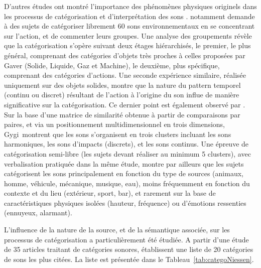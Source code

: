 D'autres études ont montré l'importance des phénomènes physiques originels dans les processus de catégorisation et d'interprétation des sons \citep{marcell2000confrontation,lemaitre2010listener}. \citep{houix_lexical_2012} notamment demande à des sujets de catégoriser librement 60 sons environnementaux en se concentrant sur l'action, et de commenter leurs groupes. Une analyse des groupements révèle que la catégorisation s'opère suivant deux étages hiérarchisés, le premier, le plus général, comprenant des catégories d'objets très proches à celles proposées par Gaver (Solide, Liquide, Gaz et Machine), le deuxième, plus spécifique, comprenant des catégories d'actions. Une seconde expérience similaire, réalisée uniquement sur des objets solides, montre que la nature du pattern temporel (continu ou discret) résultant de l'action à l'origine du son influe de manière significative sur la catégorisation. Ce dernier point est également observé par \citep{gygi2007similarity}. Sur la base d'une matrice de similarité obtenue à partir de comparaisons par paires, et via un positionnement multidimensionnel en trois dimensions, Gygi~\al montrent que les sons s'organisent en trois clusters incluant les sons harmoniques, les sons d'impacts (discrets), et les sons continus. Une épreuve de catégorisation semi-libre (les sujets devant réaliser au minimum 5 clusters), avec verbalisation pratiquée dans la même étude, montre par ailleurs que les sujets catégorisent les sons principalement en fonction du type de sources (animaux, homme, véhicule, mécanique, musique, eau), moins fréquemment en fonction du contexte et du lieu (extérieur, sport, bar), et rarement sur la base de caractéristiques physiques isolées (hauteur, fréquence) ou d'émotions ressenties (ennuyeux, alarmant).

L'influence de la nature de la source, et de la sémantique associée, sur les processus de catégorisation a particulièrement été étudiée. A partir d'une étude de 35 articles traitant de catégories sonores, \citep{niessen2010categories} établissent une liste de 20 catégories de sons les plus citées. La liste est présentée dans le Tableau~\ref{tab:categoNiessen}.

